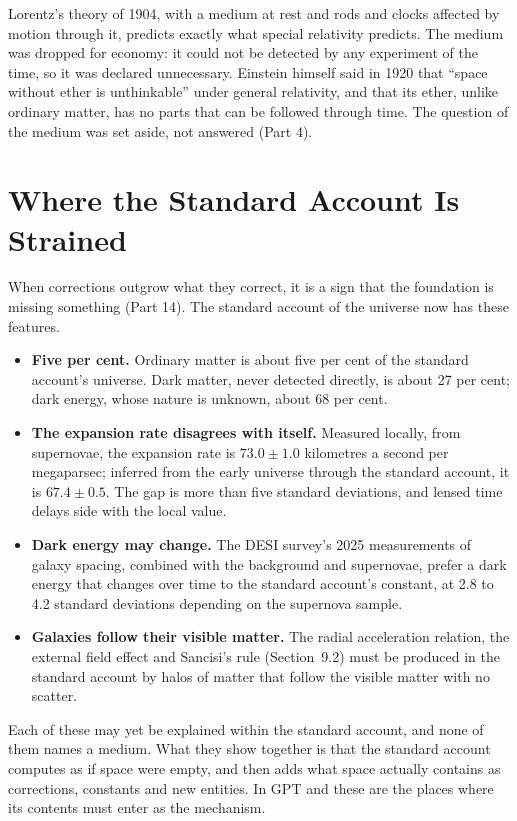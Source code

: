 \documentclass[11pt,a4paper]{article}
\begin{document}
 Lorentz's theory of 1904, with a medium at rest and rods and clocks affected by motion through it, predicts exactly what special relativity predicts. The medium was dropped for economy: it could not be detected by any experiment of the time, so it was declared unnecessary. Einstein himself said in 1920 that ``space without ether is unthinkable'' under general relativity, and that its ether, unlike ordinary matter, has no parts that can be followed through time. The question of the medium was set aside, not answered (Part 4).

\section{Where the Standard Account Is Strained}

When corrections outgrow what they correct, it is a sign that the foundation is missing something (Part 14). The standard account of the universe now has these features.
\begin{itemize}
\item \textbf{Five per cent.} Ordinary matter is about five per cent of the standard account's universe. Dark matter, never detected directly, is about 27 per cent; dark energy, whose nature is unknown, about 68 per cent.
\item \textbf{The expansion rate disagrees with itself.} Measured locally, from supernovae, the expansion rate is $73.0\pm1.0$ kilometres a second per megaparsec; inferred from the early universe through the standard account, it is $67.4\pm0.5$. The gap is more than five standard deviations, and lensed time delays side with the local value.
\item \textbf{Dark energy may change.} The DESI survey's 2025 measurements of galaxy spacing, combined with the background and supernovae, prefer a dark energy that changes over time to the standard account's constant, at 2.8 to 4.2 standard deviations depending on the supernova sample.
\item \textbf{Galaxies follow their visible matter.} The radial acceleration relation, the external field effect and Sancisi's rule (Section~9.2) must be produced in the standard account by halos of matter that follow the visible matter with no scatter.
\end{itemize}

 Each of these may yet be explained within the standard account, and none of them names a medium. What they show together is that the standard account computes as if space were empty, and then adds what space actually contains as corrections, constants and new entities. In GPT  and these are the places where its contents must enter as the mechanism.
\end{document}
